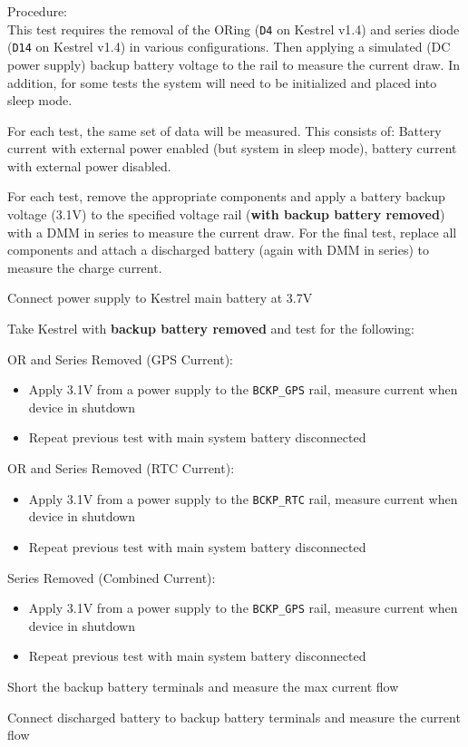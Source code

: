 {\Large Procedure: }\\
This test requires the removal of the ORing (\texttt{D4} on Kestrel v1.4) and series diode (\texttt{D14} on Kestrel v1.4) in various configurations. Then applying a simulated (DC power supply) backup battery voltage to the rail to measure the current draw. In addition, for some tests the system will need to be initialized and placed into sleep mode.

For each test, the same set of data will be measured. This consists of: Battery current with external power enabled (but system in sleep mode), battery current with external power disabled. 

For each test, remove the appropriate components and apply a battery backup voltage (3.1V) to the specified voltage rail (\textbf{with backup battery removed}) with a DMM in series to measure the current draw. For the final test, replace all components and attach a discharged battery (again with DMM in series) to measure the charge current. 

Connect power supply to Kestrel main battery at 3.7V

Take Kestrel with \textbf{backup battery removed} and test for the following:

\begin{description}
\item OR and Series Removed (GPS Current):
\begin{itemize}
\item Apply 3.1V from a power supply to the \texttt{BCKP\_GPS} rail, measure current when device in shutdown 
\item Repeat previous test with main system battery disconnected 
\end{itemize}

\item OR and Series Removed (RTC Current):
\begin{itemize}
\item Apply 3.1V from a power supply to the \texttt{BCKP\_RTC} rail, measure current when device in shutdown 
\item Repeat previous test with main system battery disconnected 
\end{itemize}

\item Series Removed (Combined Current):
\begin{itemize}
\item Apply 3.1V from a power supply to the \texttt{BCKP\_GPS} rail, measure current when device in shutdown 
\item Repeat previous test with main system battery disconnected 
\end{itemize}

\item Short the backup battery terminals and measure the max current flow 
\item Connect discharged battery to backup battery terminals and measure the current flow

\end{description}

